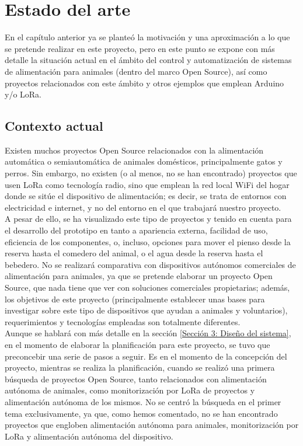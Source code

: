 \documentclass[12pt]{article}
\begin{document}
	\pagebreak
	

	\section[Estado del arte]{Estado del arte}  
	
	\noindent En el capítulo anterior ya se planteó la motivación y una aproximación a lo que se pretende realizar en este proyecto, pero en este punto se expone con más detalle la situación actual en el ámbito del control y automatización de sistemas de alimentación para animales (dentro del marco Open Source), así como proyectos relacionados con este ámbito y otros ejemplos que emplean Arduino y/o LoRa.
	
	\subsection[Contexto actual]{Contexto actual}
		
	\noindent Existen muchos proyectos Open Source relacionados con la alimentación automática o semiautomática de animales domésticos, principalmente gatos y perros. Sin embargo, no existen (o al menos, no se han encontrado) proyectos que usen LoRa como tecnología radio, sino que emplean la red local WiFi del hogar donde se sitúe el dispositivo de alimentación; es decir, se trata de entornos con electricidad e internet, y no del entorno en el que trabajará nuestro proyecto. \\
	
	\noindent A pesar de ello, se ha visualizado este tipo de proyectos y tenido en cuenta para el desarrollo del prototipo en tanto a apariencia externa, facilidad de uso, eficiencia de los componentes, o, incluso, opciones para mover el pienso desde la reserva hasta el comedero del animal, o el agua desde la reserva hasta el bebedero. No se realizará comparativa con dispositivos autónomos comerciales de alimentación para animales, ya que se pretende elaborar un proyecto Open Source, que nada tiene que ver con soluciones comerciales propietarias; además, los objetivos de este proyecto (principalmente establecer unas bases para investigar sobre este tipo de dispositivos que ayudan a animales y voluntarios), requerimientos y tecnologías empleadas son totalmente diferentes. \\
	
	\noindent Aunque se hablará con más detalle en la sección \ref{Sección 3: Diseño del sistema}, en el momento de elaborar la planificación para este proyecto, se tuvo que preconcebir una serie de pasos a seguir. Es en el momento de la concepción del proyecto, mientras se realiza la planificación, cuando se realizó una primera búsqueda de proyectos Open Source, tanto relacionados con alimentación autónoma de animales, como monitorización por LoRa de proyectos y alimentación autónoma de los mismos. No se centró la búsqueda en el primer tema exclusivamente, ya que, como hemos comentado, no se han encontrado proyectos que engloben alimentación autónoma para animales, monitorización por LoRa y alimentación autónoma del dispositivo.\\
	
\end{document}
